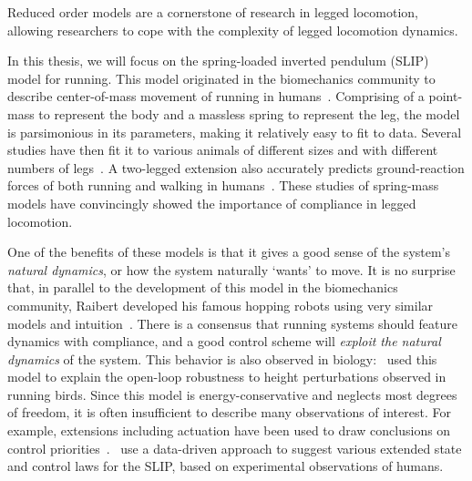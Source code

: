 Reduced order models are a cornerstone of research in legged locomotion, allowing researchers to cope with the complexity of legged locomotion dynamics. \par
In this thesis, we will focus on the spring-loaded inverted pendulum (SLIP) model for running. This model originated in the biomechanics community to describe center-of-mass movement of running in humans~\cite{blickhan1989spring}. Comprising of a point-mass to represent the body and a massless spring to represent the leg, the model is parsimonious in its parameters, making it relatively easy to fit to data.
Several studies have then fit it to various animals of different sizes and with different numbers of legs~\cite{blickhan1993similarity,daley2006running,jindrich2002dynamic}. A two-legged extension also accurately predicts ground-reaction forces of both running and walking in humans~\cite{geyer2006compliant}. These studies of spring-mass models have convincingly showed the importance of compliance in legged locomotion. \par
One of the benefits of these models is that it gives a good sense of the system's \emph{natural dynamics}, or how the system naturally `wants' to move.
It is no surprise that, in parallel to the development of this model in the biomechanics community, Raibert developed his famous hopping robots using very similar models and intuition~\cite[see Figure 2.5]{raibert1986legged}.
There is a consensus that running systems should feature dynamics with compliance, and a good control scheme will \emph{exploit the natural dynamics} of the system.
This behavior is also observed in biology:~\textcite{daley2006running} used this model to explain the open-loop robustness to height perturbations observed in running birds.
Since this model is energy-conservative and neglects most degrees of freedom, it is often insufficient to describe many observations of interest. For example, extensions including actuation have been used to draw conclusions on control priorities~\cite{Birn-Jeffery3786,blum2014swing}.~\textcite{maus2015constructing} use a data-driven approach to suggest various extended state and control laws for the SLIP, based on experimental observations of humans. %

